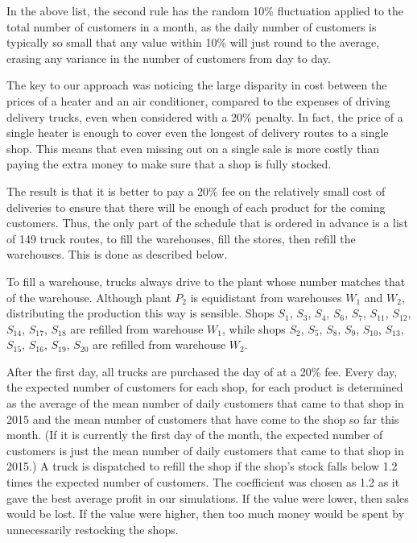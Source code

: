 \begin{paper}
In the above list, the second rule has the random 10\% fluctuation applied to
the total number of customers in a month, as the daily number of customers is
typically so small that any value within 10\% will just round to the average,
erasing any variance in the number of customers from day to day.


The key to our approach was noticing the large disparity in cost between the
prices of a heater and an air conditioner, compared to the expenses of driving
delivery trucks, even when considered with a 20\% penalty.
In fact, the price of a single heater is enough to cover even the longest of
delivery routes to a single shop.
This means that even missing out on a single sale is more costly than paying the
extra money to make sure that a shop is fully stocked.

The result is that it is better to pay a 20\% fee on the relatively small cost
of deliveries to ensure that there will be enough of each product for the coming
customers.
Thus, the only part of the schedule that is ordered in advance is a list of 149 truck
routes, to fill the warehouses, fill the stores, then refill the warehouses.
This is done as described below.

To fill a warehouse, trucks always drive to the plant whose number matches that
of the warehouse.
Although plant $P_2$ is equidistant from warehouses $W_1$ and $W_2$, distributing the production
this way is sensible.
Shops $S_1$, $S_3$, $S_4$, $S_6$, $S_7$, $S_{11}$, $S_{12}$, $S_{14}$, $S_{17}$, $S_{18}$ are refilled from warehouse $W_1$, while shops $S_2$, $S_5$, $S_8$, $S_9$, $S_{10}$, $S_{13}$, $S_{15}$, $S_{16}$, $S_{19}$, $S_{20}$ are refilled from warehouse $W_2$.

After the first day, all trucks are purchased the day of at a 20\% fee.
Every day, the expected number of customers for each shop, for each product is determined as the average of 
the mean number of daily customers that came to that shop in 2015 and the mean number of customers that have come to the
shop so far this month.
(If it is currently the first day of the month, the expected number of customers is just the mean number of daily customers that came to that shop in 2015.)
A truck is dispatched to refill the shop if the shop's stock falls below 1.2 times the expected number of customers.
The coefficient was chosen as 1.2 as it gave the best average profit in our simulations.
If the value were lower, then sales would be lost.
If the value were higher, then too much money would be spent by unnecessarily restocking the shops.


\end{paper}
